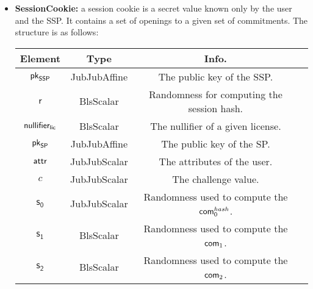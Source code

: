 \begin{itemize}
    \item \textbf{SessionCookie:} a session cookie is a secret value known only by the user and the SSP. It contains a set of openings to a given set of commitments. The structure is as follows:

    \begin{center}
        \begin{tabular}{ |c|c|c|c| } 
        \hline
        \textbf{Element} & \textbf{Type} & \textbf{Info.} \\
        \hline
        $\mathsf{pk}_{\mathsf{SSP}}$ & JubJubAffine & The public key of the SSP. \\
        $\mathsf{r}$ & BlsScalar & Randomness for computing the session hash. \\
        $\mathsf{nullifier_{lic}}$ & BlsScalar & The nullifier of a given license. \\ 
        $\mathsf{pk}_{\mathsf{SP}}$ & JubJubAffine & The public key of the SP. \\ 
        $\mathsf{attr}$ & JubJubScalar & The attributes of the user. \\ 
        $c$ & JubJubScalar & The challenge value. \\ 
        $\mathsf{s_0}$ & JubJubScalar & Randomness used to compute the $\mathsf{com}_0^{hash}$. \\
        $\mathsf{s_1}$ & BlsScalar & Randomness used to compute the $\mathsf{com}_1$. \\
        $\mathsf{s_2}$ & BlsScalar & Randomness used to compute the $\mathsf{com}_2$. \\
        \hline
        \end{tabular}
    \end{center}

\end{itemize}